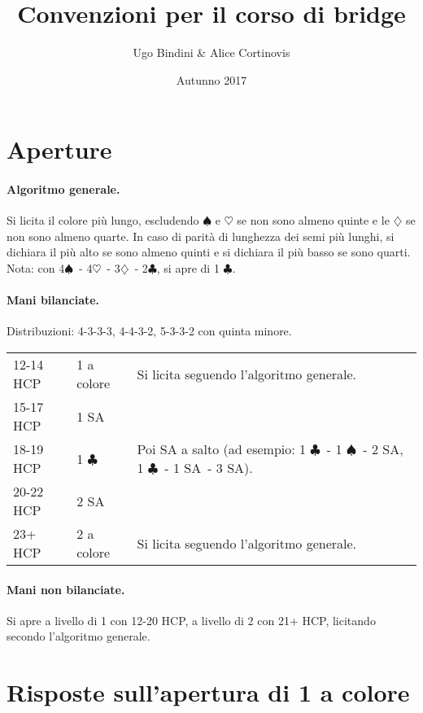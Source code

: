 \documentclass[a4paper,10pt]{article}
\title{Convenzioni per il corso di bridge}
\author{Ugo Bindini \& Alice Cortinovis}
\date{Autunno 2017}
\renewcommand{\c}{$\clubsuit$\xspace}
\renewcommand{\d}{$\diamondsuit$\xspace}
\newcommand{\h}{$\heartsuit$\xspace}
\newcommand{\s}{$\spadesuit$\xspace}
\newcommand{\sa}{SA\xspace}
\newcommand{\smallspace}{\vskip0.3cm}
\newenvironment{threecol}
  {\smallspace\noindent\begin{tabular}{l l p{0.78\textwidth}}}
  {\end{tabular}\smallspace}
\begin{document}
\maketitle

\section{Aperture}

\paragraph{Algoritmo generale.}
Si licita il colore più lungo, escludendo \s e \h se non sono almeno quinte e le \d se non sono almeno quarte.
In caso di parità di lunghezza dei semi più lunghi, si dichiara il più alto se sono almeno quinti e si dichiara il più basso se sono quarti.
Nota: con 4\s\ - 4\h\ - 3\d\ - 2\c, si apre di 1 \c.

\paragraph{Mani bilanciate.} Distribuzioni: 4-3-3-3, 4-4-3-2, 5-3-3-2 con quinta minore.

\begin{threecol}
 12-14 HCP & 1 a colore & Si licita seguendo l'algoritmo generale.\\
 15-17 HCP & 1 \sa\\
 18-19 HCP & 1 \c & Poi \sa a salto (ad esempio: 1 \c\ - 1 \s\ - 2 \sa, 1 \c\ - 1 \sa\ - 3 \sa).\\
 20-22 HCP & 2 \sa\\
 23+ HCP & 2 a colore & Si licita seguendo l'algoritmo generale.
\end{threecol}

\paragraph{Mani non bilanciate.} Si apre a livello di 1 con 12-20 HCP, a livello di 2 con 21+ HCP, licitando secondo l'algoritmo generale.


\section{Risposte sull'apertura di 1 a colore}
\end{document}
